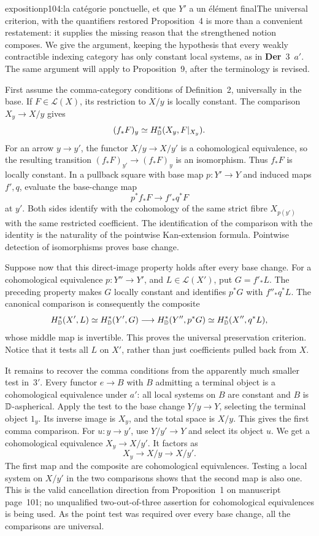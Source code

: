 \begin{dcomment}{exposition}{p104:la catégorie ponctuelle, et que $Y'$ a un élément final}{The universal criterion, with the quantifiers restored}
Proposition~4 is more than a convenient restatement: it supplies the missing reason that the strengthened notion composes. We give the argument, keeping the hypothesis that every weakly contractible indexing category has only constant local systems, as in \textbf{Der}~3~$a'$. The same argument will apply to Proposition~9, after the terminology is revised.

First assume the comma-category conditions of Definition~2, universally in the base. If $F\in\mathcal L(X)$, its restriction to $X/y$ is locally constant. The comparison $X_y\to X/y$ gives
\[
 (f_*F)_y\simeq H^*_{\mathbb{D}}(X_y,F|_{X_y}).
\]
For an arrow $y\to y'$, the functor $X/y\to X/y'$ is a cohomological equivalence, so the resulting transition $(f_*F)_{y'}\to(f_*F)_y$ is an isomorphism. Thus $f_*F$ is locally constant. In a pullback square with base map $p:Y'\to Y$ and induced maps $f',q$, evaluate the base-change map
\[
 p^*f_*F\longrightarrow f'_*q^*F
\]
at $y'$. Both sides identify with the cohomology of the same strict fibre $X_{p(y')}$ with the same restricted coefficient. The identification of the comparison with the identity is the naturality of the pointwise Kan-extension formula. Pointwise detection of isomorphisms proves base change.

Suppose now that this direct-image property holds after every base change. For a cohomological equivalence $p:Y''\to Y'$, and $L\in\mathcal L(X')$, put $G=f'_*L$. The preceding property makes $G$ locally constant and identifies $p^*G$ with $f''_*q^*L$. The canonical comparison is consequently the composite
\[
 H^*_{\mathbb{D}}(X',L)\simeq H^*_{\mathbb{D}}(Y',G)
 \longrightarrow H^*_{\mathbb{D}}(Y'',p^*G)
 \simeq H^*_{\mathbb{D}}(X'',q^*L),
\]
whose middle map is invertible. This proves the universal preservation criterion. Notice that it tests all $L$ on $X'$, rather than just coefficients pulled back from $X$.

It remains to recover the comma conditions from the apparently much smaller test in~$3'$. Every functor $e\to B$ with $B$ admitting a terminal object is a cohomological equivalence under $a'$: all local systems on $B$ are constant and $B$ is $\mathbb{D}$-aspherical. Apply the test to the base change $Y/y\to Y$, selecting the terminal object $1_y$. Its inverse image is $X_y$, and the total space is $X/y$. This gives the first comma comparison. For $u:y\to y'$, use $Y/y'\to Y$ and select its object $u$. We get a cohomological equivalence $X_y\to X/y'$. It factors as
\[
 X_y\longrightarrow X/y\longrightarrow X/y'.
\]
The first map and the composite are cohomological equivalences. Testing a local system on $X/y'$ in the two comparisons shows that the second map is also one. This is the valid cancellation direction from Proposition~1 on manuscript page~101; no unqualified two-out-of-three assertion for cohomological equivalences is being used. As the point test was required over every base change, all the comparisons are universal.


\end{dcomment}
